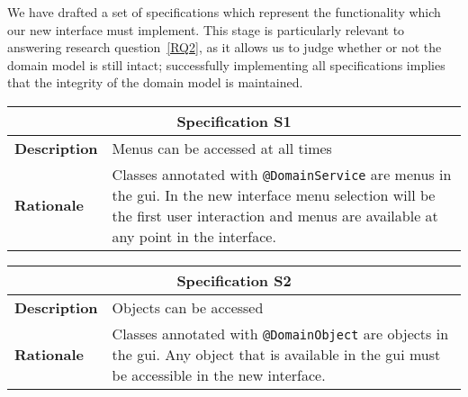 We have drafted a set of specifications which represent the functionality which our new interface must implement. This stage is particularly relevant to answering research question~\ref{RQ2}, as it allows us to judge whether or not the domain model is still intact; successfully implementing all specifications implies that the integrity of the domain model is maintained.

\newpage
\noindent
\small

\begin{tabularx}{0.49\textwidth}[t]{lX}
	\toprule
	\multicolumn{2}{c}{\textbf{Specification S1}} \\
	\midrule
	\textbf{Description} & Menus can be accessed at all times \\
	\addlinespace[0.5em]
	\textbf{Rationale}	 & Classes annotated with \texttt{@DomainService} are menus in the \acrshort{gui}. In the new interface menu selection will be the first user interaction and menus are available at any point in the interface. \\
	\bottomrule
\end{tabularx}\hspace{0.02\textwidth}
\begin{tabularx}{0.49\textwidth}[t]{lX}
	\toprule
	\multicolumn{2}{c}{\textbf{Specification S2}} \\
	\midrule
	\textbf{Description} & Objects can be accessed \newline \\
	\addlinespace[0.5em]
	\textbf{Rationale}	 & Classes annotated with \texttt{@DomainObject} are objects in the \acrshort{gui}. Any object that is available in the \acrshort{gui} must be accessible in the new interface. \newline \\
	\bottomrule
\end{tabularx}
\\[1em]

